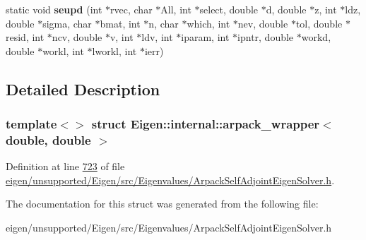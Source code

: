 \begin{DoxyCompactItemize}
\item 
\mbox{\label{struct_eigen_1_1internal_1_1arpack__wrapper_3_01double_00_01double_01_4_a79f34b55ad545b2db0d273bf279b0ba5}} 
static void {\bfseries seupd} (int $\ast$rvec, char $\ast$All, int $\ast$select, double $\ast$d, double $\ast$z, int $\ast$ldz, double $\ast$sigma, char $\ast$bmat, int $\ast$n, char $\ast$which, int $\ast$nev, double $\ast$tol, double $\ast$resid, int $\ast$ncv, double $\ast$v, int $\ast$ldv, int $\ast$iparam, int $\ast$ipntr, double $\ast$workd, double $\ast$workl, int $\ast$lworkl, int $\ast$ierr)
\end{DoxyCompactItemize}


\subsection{Detailed Description}
\subsubsection*{template$<$$>$\newline
struct Eigen\+::internal\+::arpack\+\_\+wrapper$<$ double, double $>$}



Definition at line \hyperlink{eigen_2unsupported_2_eigen_2src_2_eigenvalues_2_arpack_self_adjoint_eigen_solver_8h_source_l00723}{723} of file \hyperlink{eigen_2unsupported_2_eigen_2src_2_eigenvalues_2_arpack_self_adjoint_eigen_solver_8h_source}{eigen/unsupported/\+Eigen/src/\+Eigenvalues/\+Arpack\+Self\+Adjoint\+Eigen\+Solver.\+h}.



The documentation for this struct was generated from the following file\+:\begin{DoxyCompactItemize}
\item 
eigen/unsupported/\+Eigen/src/\+Eigenvalues/\+Arpack\+Self\+Adjoint\+Eigen\+Solver.\+h\end{DoxyCompactItemize}
